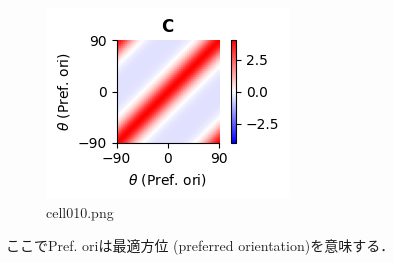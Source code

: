\begin{figure}[ht]
	\centering
	\includegraphics[scale=0.8, max width=\linewidth]{./fig/bayesian-brain/neural-sampling/cell010.png}
	\caption{cell010.png}
	\label{cell010.png}
\end{figure}
ここでPref. oriは最適方位 (preferred orientation)を意味する．
